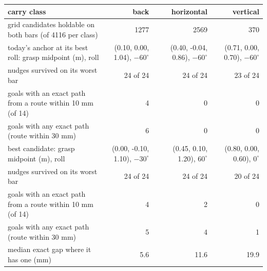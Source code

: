 \begin{tabular}{@{}>{\raggedright\arraybackslash}p{6.0cm} rrr@{}}
\toprule
carry class & back & horizontal & vertical \\
\midrule
grid candidates holdable on both bars (of 4116 per class) & 1277 & 2569 & 370 \\
\midrule
today's anchor at its best roll: grasp midpoint (m), roll & (0.10, 0.00, 1.04), $-60^\circ$ & (0.40, -0.04, 0.86), $-60^\circ$ & (0.71, 0.00, 0.70), $-60^\circ$ \\
\quad nudges survived on its worst bar & 24 of 24 & 24 of 24 & 23 of 24 \\
\quad goals with an exact path from a route within 10 mm (of 14) & 4 & 0 & 0 \\
\quad goals with any exact path (route within 30 mm) & 6 & 0 & 0 \\
\midrule
best candidate: grasp midpoint (m), roll & (0.00, -0.10, 1.10), $-30^\circ$ & (0.45, 0.10, 1.20), $60^\circ$ & (0.80, 0.00, 0.60), $0^\circ$ \\
\quad nudges survived on its worst bar & 24 of 24 & 24 of 24 & 20 of 24 \\
\quad goals with an exact path from a route within 10 mm (of 14) & 4 & 2 & 0 \\
\quad goals with any exact path (route within 30 mm) & 5 & 4 & 1 \\
\quad median exact gap where it has one (mm) & 5.6 & 11.6 & 19.9 \\
\bottomrule
\end{tabular}
